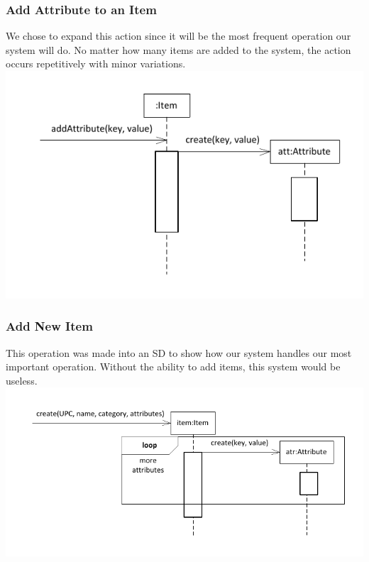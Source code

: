 \documentclass{article}
\begin{document}
\subsubsection{Add Attribute to an Item}
We chose to expand this action since it will be the most frequent operation our system will do.  No matter how many items are added to the system, the action occurs repetitively with minor variations.\\
\includegraphics[keepaspectratio, width=6in]{sd_item_add_attribute.pdf}\\
\subsubsection{Add New Item}
This operation was made into an SD to show how our system handles our most important operation.  Without the ability to add items, this system would be useless.\\
\includegraphics[keepaspectratio, width=6in]{sd_catalog_add_item.pdf}\\
\end{document}

